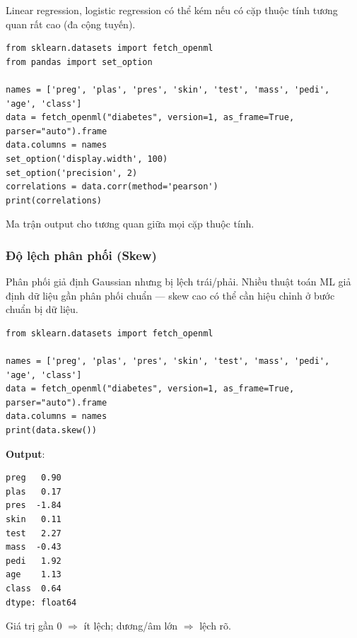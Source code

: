 \begin{luuy}[title={Vì sao xem ma trận tương quan}]
Linear regression, logistic regression có thể kém nếu có cặp thuộc tính tương quan rất cao (đa cộng tuyến).
\end{luuy}

\begin{vidu}[title={corr() Pearson}]
\begin{lstlisting}
from sklearn.datasets import fetch_openml
from pandas import set_option

names = ['preg', 'plas', 'pres', 'skin', 'test', 'mass', 'pedi', 'age', 'class']
data = fetch_openml("diabetes", version=1, as_frame=True, parser="auto").frame
data.columns = names
set_option('display.width', 100)
set_option('precision', 2)
correlations = data.corr(method='pearson')
print(correlations)
\end{lstlisting}
Ma trận output cho tương quan giữa mọi cặp thuộc tính.
\end{vidu}

\subsubsection{Độ lệch phân phối (Skew)}

\begin{ynghia}[title={Skewness}]
Phân phối giả định Gaussian nhưng bị lệch trái/phải.
Nhiều thuật toán ML giả định dữ liệu gần phân phối chuẩn --- skew cao có thể cần hiệu chỉnh ở bước chuẩn bị dữ liệu.
\end{ynghia}

\begin{vidu}[title={skew() trên Pima dataset}]
\begin{lstlisting}
from sklearn.datasets import fetch_openml

names = ['preg', 'plas', 'pres', 'skin', 'test', 'mass', 'pedi', 'age', 'class']
data = fetch_openml("diabetes", version=1, as_frame=True, parser="auto").frame
data.columns = names
print(data.skew())
\end{lstlisting}
\textbf{Output}:
\begin{lstlisting}
preg   0.90
plas   0.17
pres  -1.84
skin   0.11
test   2.27
mass  -0.43
pedi   1.92
age    1.13
class  0.64
dtype: float64
\end{lstlisting}
Giá trị gần 0 $\Rightarrow$ ít lệch; dương/âm lớn $\Rightarrow$ lệch rõ.
\end{vidu}
